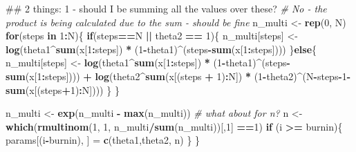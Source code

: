 \documentclass[]{book}
\newenvironment{Shaded}{\begin{snugshade}}{\end{snugshade}}
\newcommand{\KeywordTok}[1]{\textcolor[rgb]{0.13,0.29,0.53}{\textbf{#1}}}
\newcommand{\DecValTok}[1]{\textcolor[rgb]{0.00,0.00,0.81}{#1}}
\newcommand{\StringTok}[1]{\textcolor[rgb]{0.31,0.60,0.02}{#1}}
\newcommand{\CommentTok}[1]{\textcolor[rgb]{0.56,0.35,0.01}{\textit{#1}}}
\newcommand{\ControlFlowTok}[1]{\textcolor[rgb]{0.13,0.29,0.53}{\textbf{#1}}}
\newcommand{\OperatorTok}[1]{\textcolor[rgb]{0.81,0.36,0.00}{\textbf{#1}}}
\newcommand{\NormalTok}[1]{#1}
\theoremstyle{definition}
\theoremstyle{definition}
\theoremstyle{definition}
\theoremstyle{remark}
\begin{document}
\begin{Shaded}
\begin{Highlighting}[]
  
\NormalTok{  ## 2 things: 1 - should I be summing all the values over these? }
  \CommentTok{# No - the product is being calculated due to the sum - should be fine}
\NormalTok{  n_multi <-}\StringTok{ }\KeywordTok{rep}\NormalTok{(}\DecValTok{0}\NormalTok{, N)}
  \ControlFlowTok{for}\NormalTok{(steps }\ControlFlowTok{in} \DecValTok{1}\OperatorTok{:}\NormalTok{N)\{}
    \ControlFlowTok{if}\NormalTok{(steps}\OperatorTok{==}\NormalTok{N }\OperatorTok{||}\StringTok{ }\NormalTok{theta2 }\OperatorTok{==}\StringTok{ }\DecValTok{1}\NormalTok{)\{}
\NormalTok{      n_multi[steps] <-}\StringTok{ }\KeywordTok{log}\NormalTok{(theta1}\OperatorTok{^}\KeywordTok{sum}\NormalTok{(x[}\DecValTok{1}\OperatorTok{:}\NormalTok{steps]) }\OperatorTok{*}\StringTok{ }\NormalTok{(}\DecValTok{1}\OperatorTok{-}\NormalTok{theta1)}\OperatorTok{^}\NormalTok{(steps}\OperatorTok{-}\KeywordTok{sum}\NormalTok{(x[}\DecValTok{1}\OperatorTok{:}\NormalTok{steps])))}
\NormalTok{    \}}\ControlFlowTok{else}\NormalTok{\{}
\NormalTok{      n_multi[steps] <-}\StringTok{ }\KeywordTok{log}\NormalTok{(theta1}\OperatorTok{^}\KeywordTok{sum}\NormalTok{(x[}\DecValTok{1}\OperatorTok{:}\NormalTok{steps]) }\OperatorTok{*}\StringTok{ }\NormalTok{(}\DecValTok{1}\OperatorTok{-}\NormalTok{theta1)}\OperatorTok{^}\NormalTok{(steps}\OperatorTok{-}\KeywordTok{sum}\NormalTok{(x[}\DecValTok{1}\OperatorTok{:}\NormalTok{steps]))) }\OperatorTok{+}
\StringTok{        }\KeywordTok{log}\NormalTok{(theta2}\OperatorTok{^}\KeywordTok{sum}\NormalTok{(x[(steps }\OperatorTok{+}\StringTok{ }\DecValTok{1}\NormalTok{)}\OperatorTok{:}\NormalTok{N]) }\OperatorTok{*}\StringTok{ }\NormalTok{(}\DecValTok{1}\OperatorTok{-}\NormalTok{theta2)}\OperatorTok{^}\NormalTok{(N}\OperatorTok{-}\NormalTok{steps}\OperatorTok{-}\DecValTok{1}\OperatorTok{-}\KeywordTok{sum}\NormalTok{(x[(steps}\OperatorTok{+}\DecValTok{1}\NormalTok{)}\OperatorTok{:}\NormalTok{N])))}
\NormalTok{    \}}
\NormalTok{  \}}
  
\NormalTok{  n_multi <-}\StringTok{ }\KeywordTok{exp}\NormalTok{(n_multi }\OperatorTok{-}\StringTok{ }\KeywordTok{max}\NormalTok{(n_multi))}
  \CommentTok{# what about for n? }
\NormalTok{  n <-}\StringTok{ }\KeywordTok{which}\NormalTok{(}\KeywordTok{rmultinom}\NormalTok{(}\DecValTok{1}\NormalTok{, }\DecValTok{1}\NormalTok{, n_multi}\OperatorTok{/}\KeywordTok{sum}\NormalTok{(n_multi))[,}\DecValTok{1}\NormalTok{] }\OperatorTok{==}\DecValTok{1}\NormalTok{)}
  \ControlFlowTok{if}\NormalTok{ (i }\OperatorTok{>=}\StringTok{ }\NormalTok{burnin)\{}
\NormalTok{    params[(i}\OperatorTok{-}\NormalTok{burnin), ] =}\StringTok{ }\KeywordTok{c}\NormalTok{(theta1,theta2, n)}
\NormalTok{  \}}
\NormalTok{\}}


\end{Highlighting}
\end{Shaded}
\end{document}
